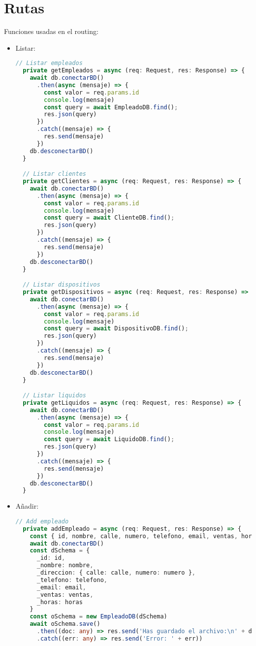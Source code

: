 \documentclass[a4paper]{article} %
\begin{document}
\section{Rutas}
Funciones usadas en el routing:
\begin{itemize}
	\item Listar:
\begin{lstlisting}[language=Typescript]
	// Listar empleados
  private getEmpleados = async (req: Request, res: Response) => {
    await db.conectarBD()
      .then(async (mensaje) => {
        const valor = req.params.id
        console.log(mensaje)
        const query = await EmpleadoDB.find();
        res.json(query)
      })
      .catch((mensaje) => {
        res.send(mensaje)
      })
    db.desconectarBD()
  }

  // Listar clientes
  private getClientes = async (req: Request, res: Response) => {
    await db.conectarBD()
      .then(async (mensaje) => {
        const valor = req.params.id
        console.log(mensaje)
        const query = await ClienteDB.find();
        res.json(query)
      })
      .catch((mensaje) => {
        res.send(mensaje)
      })
    db.desconectarBD()
  }

  // Listar dispositivos
  private getDispositivos = async (req: Request, res: Response) => {
    await db.conectarBD()
      .then(async (mensaje) => {
        const valor = req.params.id
        console.log(mensaje)
        const query = await DispositivoDB.find();
        res.json(query)
      })
      .catch((mensaje) => {
        res.send(mensaje)
      })
    db.desconectarBD()
  }

  // Listar liquidos
  private getLiquidos = async (req: Request, res: Response) => {
    await db.conectarBD()
      .then(async (mensaje) => {
        const valor = req.params.id
        console.log(mensaje)
        const query = await LiquidoDB.find();
        res.json(query)
      })
      .catch((mensaje) => {
        res.send(mensaje)
      })
    db.desconectarBD()
  }
\end{lstlisting}\clearpage
	\item Añadir:
\begin{lstlisting}[language=Typescript]
	// Add empleado
  private addEmpleado = async (req: Request, res: Response) => {
    const { id, nombre, calle, numero, telefono, email, ventas, horas } = req.body
    await db.conectarBD()
    const dSchema = {
      _id: id,
      _nombre: nombre,
      _direccion: { calle: calle, numero: numero },
      _telefono: telefono,
      _email: email,
      _ventas: ventas,
      _horas: horas
    }
    const oSchema = new EmpleadoDB(dSchema)
    await oSchema.save()
      .then((doc: any) => res.send('Has guardado el archivo:\n' + doc))
      .catch((err: any) => res.send('Error: ' + err))


\end{lstlisting}
\end{itemize}
\end{document}
